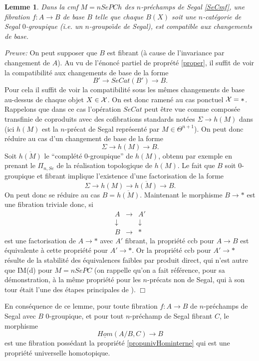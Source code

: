 \documentclass[12pt]{article}
\newcommand{\eop}{\hfill $\Box$\vspace{.1in}}
\newtheorem{lemme}[lemma]{Lemme}
\newcommand{\Xx}{{\cal X}}
\begin{document}
\begin{lemme}
\label{cestccb}
Dans la cmf $M=nSePCh$ des $n$-pr\'echamps de Segal \ref{SeCmf}, une
fibration
$f:A\rightarrow B$ de base $B$ telle que chaque $B(X)$ soit une
$n$-cat\'egorie de
Segal $0$-groupique (i.e. un $n$-groupo\"{\i}de de Segal), est compatible aux
changements de base.
\end{lemme}
{\em Preuve:}
On peut supposer que $B$ est fibrant (\`a cause de l'invariance par
changement
de $A$).  Au vu de l'\'enonc\'e partiel de propr\'et\'e \ref{proper},
il suffit
de voir la compatibilit\'e aux changements de base de la forme
$$
B'\rightarrow SeCat(B')\rightarrow B.
$$
Pour cela il suffit de voir la compatibilit\'e sous les m\^emes
changements de
base  au-dessus de chaque objet $X\in \Xx$. On est donc ramen\'e au cas
ponctuel
$\Xx =\ast$. Rappelons que dans ce cas l'op\'eration $SeCat$ peut \^etre vue
comme compos\'ee transfinie de coproduits avec des cofibrations standards
not\'ees $\Sigma \rightarrow h(M)$ dans \cite{nCAT} (ici $h(M)$ est la
$n$-pr\'ecat de Segal repr\'esent\'e par $M\in \Theta^{n+1}$). On peut donc
r\'eduire
au cas d'un changement de base de la forme
$$
\Sigma \rightarrow h(M) \rightarrow B.
$$
Soit $\overline{h(M)}$ le ``compl\'et\'e $0$-groupique'' de $h(M)$,
obtenu par
exemple en prenant le $\Pi _{n,Se}$ de la r\'ealisation topologique
de $h(M)$.
Le fait que $B$ soit $0$-groupique et fibrant implique l'existence d'une
factorisation de la forme
$$
\Sigma \rightarrow h(M) \rightarrow \overline{h(M)} \rightarrow B.
$$
On peut donc se r\'eduire au cas $B= \overline{h(M)}$. Maintenant le
morphisme
$B\rightarrow \ast$ est une fibration triviale donc, si
$$
\begin{array}{ccc}
A&\rightarrow &A'\\
\downarrow &&\downarrow \\
B&\rightarrow &\ast
\end{array}
$$
est une factorisation de $A\rightarrow \ast$ avec $A'$ fibrant,
la propri\'et\'e
ccb pour $A\rightarrow B$ est \'equivalente \`a cette propri\'et\'e pour
$A'\rightarrow \ast$. Or la propri\'et\'e ccb pour $A'\rightarrow \ast$
r\'esulte
de la stabilit\'e des \'equivalences faibles par produit
direct, qui n'est autre que IM(d) pour $M=nSePC$ (on rappelle qu'on a fait
r\'ef\'erence, pour sa d\'emonstration, \`a la m\^eme propri\'et\'e pour les
$n$-pr\'ecats non de Segal, qui \`a son tour \'etait l'une des \'etapes
principales de \cite{nCAT}).
\eop

En cons\'equence de ce lemme, pour toute fibration $f:A\rightarrow B$
de $n$-pr\'echamps de Segal avec $B$ $0$-groupique, et pour
tout
$n$-pr\'echamp de Segal fibrant $C$, le morphisme
$$
\underline{Hom}(A/B,C)\rightarrow B
$$
est une fibration poss\'edant
la propri\'et\'e \ref{propunivHominterne} qui est une propri\'et\'e
universelle homotopique.
\end{document}
